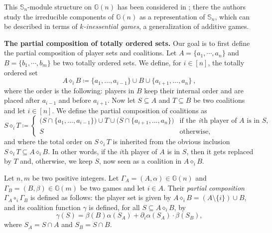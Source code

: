 \documentclass[a4paper,12pt]{amsart}
\begin{document}
\begin{remark}
This $\mathbb{S}_n$-module structure on $\mathbb{G}(n)$ has been considered in \cite{jeuxrepdesgroupessymetriques2,jeuxrepdesgroupessymetriques1}; there the authors study the irreducible components of $\mathbb{G}(n)$ as a representation of $\mathbb{S}_n$, which can be described in terms of $k$\textit{-inessential games}, a generalization of additive games. 
\end{remark}

\textbf{The partial composition of totally ordered sets.} 
Our goal is to first define the partial composition of player sets and coalitions. Let $A = \{a_1, \cdots, a_n\}$ and $B = \{b_1, \cdots, b_m \}$ be two totally ordered sets. We define, for $i \in [n]$, the totally ordered set 
\[
A \diamond_i B \coloneqq \{a_1, \ldots, a_{i-1} \} \cup B \cup \{a_{i+1}, \ldots, a_n\}~, 
\]
where the order is the following: players in $B$ keep their internal order and are placed after $a_{i-1}$ and before $a_{i+1}$. Now let $S \subseteq A$ and $T \subseteq B$ be two coalitions and let $i \in [n]$. We define the partial composition of coalitions as 
\[
S \diamond_i T \coloneqq \begin{cases}
\big( S \cap \{a_1, \ldots, a_{i-1}\} \big) \cup T \cup \big( S \cap \{a_{i+1}, \ldots, a_n\} \big) & \text{if the} ~~ i\text{th player of } A \text{ is in } S, \\
S & \text{otherwise}, 
\end{cases}
\]
and where the total order on $S \diamond_i T$ is inherited from the obvious inclusion $S \diamond_i T \subseteq A \diamond_i B$. In other words, if the $i$th player of $A$ is in $S$, then it gets replaced by $T$ and, otherwise, we keep $S$, now seen as a coalition in $A \diamond_i B$.

\begin{definition}\label{definition: partial composition of games}
Let $n, m$ be two positive integers. Let $\Gamma_A = (A, \alpha) \in \mathbb{G}(n)$ and $\Gamma_B = (B, \beta) \in \mathbb{G}(m)$ be two games and let $i \in A$. Their \textit{partial composition} $\Gamma_A \circ_i \Gamma_B$ is defined as follows: the player set is given by $A \diamond_i B = \left(A \setminus \{i\}\right) \cup B$, and its coalition function $\gamma$ is defined, for all $S \subseteq A \diamond_i B$, by
\[
\gamma(S) = \beta(B)\alpha(S_A) + \partial_i \alpha(S_A) \cdot \beta(S_B), 
\]
where $S_A = S \cap A$ and $S_B = S \cap B$. 
\end{definition}
\end{document}
